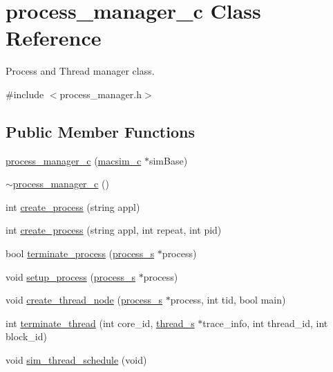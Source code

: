 \hypertarget{classprocess__manager__c}{
\section{process\_\-manager\_\-c Class Reference}
\label{classprocess__manager__c}
}


Process and Thread manager class.  




{\ttfamily \#include $<$process\_\-manager.h$>$}

\subsection*{Public Member Functions}
\begin{DoxyCompactItemize}
\item 
\hyperlink{classprocess__manager__c_acd81384cecb912bd143ec14ef1b74f95}{process\_\-manager\_\-c} (\hyperlink{classmacsim__c}{macsim\_\-c} $\ast$simBase)
\item 
\hyperlink{classprocess__manager__c_a9c459d11d9290dc96e40224eb12e51ca}{$\sim$process\_\-manager\_\-c} ()
\item 
int \hyperlink{classprocess__manager__c_aae08e9591cbeac5e916852bcd43b5708}{create\_\-process} (string appl)
\item 
int \hyperlink{classprocess__manager__c_af9c5bd91b7afdb6c53371b0228fb29b7}{create\_\-process} (string appl, int repeat, int pid)
\item 
bool \hyperlink{classprocess__manager__c_a4706b28e0c7b73c49fdc89596bca8308}{terminate\_\-process} (\hyperlink{structprocess__s}{process\_\-s} $\ast$process)
\item 
void \hyperlink{classprocess__manager__c_afe1750e1d8e076cd2efb1b62fcde1276}{setup\_\-process} (\hyperlink{structprocess__s}{process\_\-s} $\ast$process)
\item 
void \hyperlink{classprocess__manager__c_a27441c6e84b6d582d375a3670b4823df}{create\_\-thread\_\-node} (\hyperlink{structprocess__s}{process\_\-s} $\ast$process, int tid, bool main)
\item 
int \hyperlink{classprocess__manager__c_a71be3931ab2a657faf979f0a0fc719a6}{terminate\_\-thread} (int core\_\-id, \hyperlink{structthread__s}{thread\_\-s} $\ast$trace\_\-info, int thread\_\-id, int block\_\-id)
\item 
void \hyperlink{classprocess__manager__c_af6aa8eb4d2257fc6e0f6c054e298fad4}{sim\_\-thread\_\-schedule} (void)
\end{DoxyCompactItemize}
